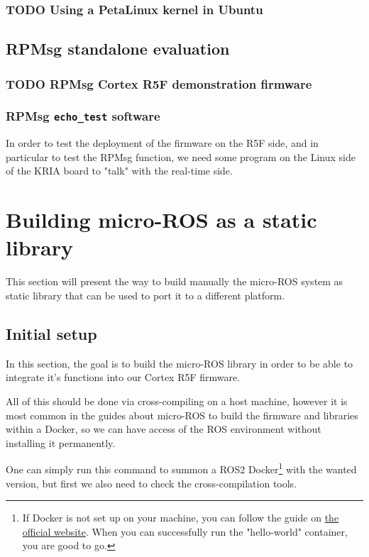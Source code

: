 \documentclass[10pt]{article}
\begin{document}
\subsubsection{{\bfseries\sffamily TODO} Using a PetaLinux kernel in Ubuntu}
\label{sec:org819ab9a}

\subsection{RPMsg standalone evaluation}
\label{sec:org470d523}
\subsubsection{{\bfseries\sffamily TODO} RPMsg Cortex R5F demonstration firmware}
\label{sec:orgdb92f4b}
\subsubsection{RPMsg \texttt{echo\_test} software}
\label{sec:orgad9ddcf}
In order to test the deployment of the firmware on the R5F side, and in particular
to test the RPMsg function, we need some program on the Linux side of the KRIA
board to "talk" with the real-time side.
\clearpage
\section{Building micro-ROS as a static library}
\label{sec:orga196385}
This section will present the way to build manually the micro-ROS system as static library
that can be used to port it to a different platform.

\subsection{Initial setup}
\label{sec:org31dc124}
In this section, the goal is to build the micro-ROS library in order to be
able to integrate it's functions into our Cortex R5F firmware.

All of this should be done via cross-compiling on a host machine, however
it is most common in the guides about micro-ROS to build the firmware and libraries within a Docker,
so we can have access of the ROS environment without installing it permanently.

One can simply run this command to summon a ROS2 Docker\footnote{If Docker is not set up on your machine, you can follow the guide on \href{https://docs.docker.com/engine/install/ubuntu/}{the official website}.
When you can successfully run the "hello-world" container, you are good to go.} with the wanted version,
but first we also need to check the cross-compilation tools.
\end{document}
